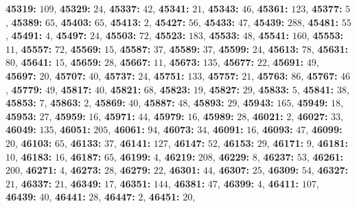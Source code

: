 \textsf{\bfseries 45319:} $109$, \textsf{\bfseries 45329:} $24$, \textsf{\bfseries 45337:} $42$, \textsf{\bfseries 45341:} $21$, \textsf{\bfseries 45343:} $46$, \textsf{\bfseries 45361:} $123$, \textsf{\bfseries 45377:} $5$, \textsf{\bfseries 45389:} $65$, \textsf{\bfseries 45403:} $65$, \textsf{\bfseries 45413:} $2$, \textsf{\bfseries 45427:} $56$, \textsf{\bfseries 45433:} $47$, \textsf{\bfseries 45439:} $288$, \textsf{\bfseries 45481:} $55$, \textsf{\bfseries 45491:} $4$, \textsf{\bfseries 45497:} $24$, \textsf{\bfseries 45503:} $72$, \textsf{\bfseries 45523:} $183$, \textsf{\bfseries 45533:} $48$, \textsf{\bfseries 45541:} $160$, \textsf{\bfseries 45553:} $11$, \textsf{\bfseries 45557:} $72$, \textsf{\bfseries 45569:} $15$, \textsf{\bfseries 45587:} $37$, \textsf{\bfseries 45589:} $37$, \textsf{\bfseries 45599:} $24$, \textsf{\bfseries 45613:} $78$, \textsf{\bfseries 45631:} $80$, \textsf{\bfseries 45641:} $15$, \textsf{\bfseries 45659:} $28$, \textsf{\bfseries 45667:} $11$, \textsf{\bfseries 45673:} $135$, \textsf{\bfseries 45677:} $22$, \textsf{\bfseries 45691:} $49$, \textsf{\bfseries 45697:} $20$, \textsf{\bfseries 45707:} $40$, \textsf{\bfseries 45737:} $24$, \textsf{\bfseries 45751:} $133$, \textsf{\bfseries 45757:} $21$, \textsf{\bfseries 45763:} $86$, \textsf{\bfseries 45767:} $46$, \textsf{\bfseries 45779:} $49$, \textsf{\bfseries 45817:} $40$, \textsf{\bfseries 45821:} $68$, \textsf{\bfseries 45823:} $19$, \textsf{\bfseries 45827:} $29$, \textsf{\bfseries 45833:} $5$, \textsf{\bfseries 45841:} $38$, \textsf{\bfseries 45853:} $7$, \textsf{\bfseries 45863:} $2$, \textsf{\bfseries 45869:} $40$, \textsf{\bfseries 45887:} $48$, \textsf{\bfseries 45893:} $29$, \textsf{\bfseries 45943:} $165$, \textsf{\bfseries 45949:} $18$, \textsf{\bfseries 45953:} $27$, \textsf{\bfseries 45959:} $16$, \textsf{\bfseries 45971:} $44$, \textsf{\bfseries 45979:} $16$, \textsf{\bfseries 45989:} $28$, \textsf{\bfseries 46021:} $2$, \textsf{\bfseries 46027:} $33$, \textsf{\bfseries 46049:} $135$, \textsf{\bfseries 46051:} $205$, \textsf{\bfseries 46061:} $94$, \textsf{\bfseries 46073:} $34$, \textsf{\bfseries 46091:} $16$, \textsf{\bfseries 46093:} $47$, \textsf{\bfseries 46099:} $20$, \textsf{\bfseries 46103:} $65$, \textsf{\bfseries 46133:} $37$, \textsf{\bfseries 46141:} $127$, \textsf{\bfseries 46147:} $52$, \textsf{\bfseries 46153:} $29$, \textsf{\bfseries 46171:} $9$, \textsf{\bfseries 46181:} $10$, \textsf{\bfseries 46183:} $16$, \textsf{\bfseries 46187:} $65$, \textsf{\bfseries 46199:} $4$, \textsf{\bfseries 46219:} $208$, \textsf{\bfseries 46229:} $8$, \textsf{\bfseries 46237:} $53$, \textsf{\bfseries 46261:} $200$, \textsf{\bfseries 46271:} $4$, \textsf{\bfseries 46273:} $28$, \textsf{\bfseries 46279:} $22$, \textsf{\bfseries 46301:} $44$, \textsf{\bfseries 46307:} $25$, \textsf{\bfseries 46309:} $54$, \textsf{\bfseries 46327:} $21$, \textsf{\bfseries 46337:} $21$, \textsf{\bfseries 46349:} $17$, \textsf{\bfseries 46351:} $144$, \textsf{\bfseries 46381:} $47$, \textsf{\bfseries 46399:} $4$, \textsf{\bfseries 46411:} $107$, \textsf{\bfseries 46439:} $40$, \textsf{\bfseries 46441:} $28$, \textsf{\bfseries 46447:} $2$, \textsf{\bfseries 46451:} $20$, 
